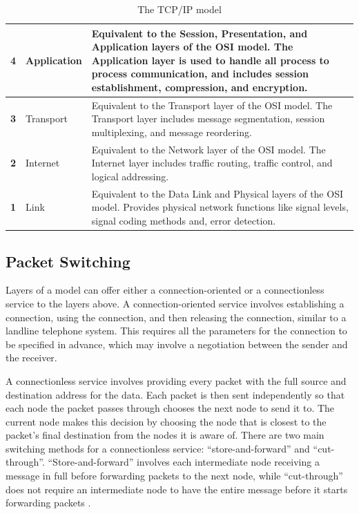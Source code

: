 \begin{table}[t]
  \caption{The TCP/IP model \cite{tcpip_pearson}}
  \begin{center}
    \begin{tabularx}{\textwidth}{|c|l|X|}
      \hline
      \textbf{4} & Application & Equivalent to the Session, Presentation, and Application layers of the OSI model. The Application layer is used to handle all process to process communication, and includes session establishment, compression, and encryption. \\ \hline
      \textbf{3} & Transport & Equivalent to the Transport layer of the OSI model. The Transport layer includes message segmentation, session multiplexing, and message reordering. \\ \hline
      \textbf{2} & Internet & Equivalent to the Network layer of the OSI model. The Internet layer includes traffic routing, traffic control, and logical addressing. \\ \hline
      \textbf{1} & Link & Equivalent to the Data Link and Physical layers of the OSI model. Provides physical network functions like signal levels, signal coding methods and, error detection. \\ \hline
    \end{tabularx}
  \end{center}
  \label{tcp_ip_model}
\end{table}

\subsection{Packet Switching}
Layers of a model can offer either a connection-oriented or a connectionless service to the layers above. A connection-oriented service involves establishing a connection, using the connection, and then releasing the connection, similar to a landline telephone system. This requires all the parameters for the connection to be specified in advance, which may involve a negotiation between the sender and the receiver.

A connectionless service involves providing every packet with the full source and destination address for the data. Each packet is then sent independently so that each node the packet passes through chooses the next node to send it to. The current node makes this decision by choosing the node that is closest to the packet's final destination from the nodes it is aware of. There are two main switching methods for a connectionless service: ``store-and-forward'' and ``cut-through''. ``Store-and-forward'' involves each intermediate node receiving a message in full before forwarding packets to the next node, while ``cut-through'' does not require an intermediate node to have the entire message before it starts forwarding packets \cite{tanenbaum}.

